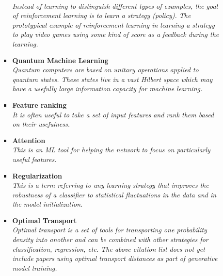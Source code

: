 \documentclass[12pt,letterpaper]{article}
\begin{document}
\begin{itemize}
\begin{itemize}
\begin{itemize}
				\\\textit{Instead of learning to distinguish different types of examples, the goal of reinforcement learning is to learn a strategy (policy).  The prototypical example of reinforcement learning in learning a strategy to play video games using some kind of score as a feedback during the learning.}
				\item \textbf{Quantum Machine Learning}~\cite{Ali:2025gni,Le:2025swl,Pyretzidis:2025stx,Rodriguez-Grasa:2025ggh,Casals:2025cuc,Yin:2025hnt,Le:2025swl,Duffy:2025hsl,Bal:2025ydm,Hammad:2024dsn,Scott:2024txs,Yang:2024bqw,Nelakurti:2024xol,Zhang:2024ebl,Lazar:2024luq,Chen:2024rna,Hoque:2023zjt,Hammad:2023wme,Rehm:2023ovj,Schuhmacher:2023pro,Wozniak:2023xbe,Rousselot:2023pcj,Duckett:2022ccc,Araz:2022zxk,Peixoto:2022zzk,Alvi:2022fkk,Delgado:2022aty,Araz:2022haf,Abel:2022lqr,Gianelle:2022unu,Ngairangbam:2021yma,Kim:2021wrr,Bravo-Prieto:2021ehz,Araz:2021ifk,Belis:2021zqi,Wu:2021xsj,Heredge:2021vww,Blance:2021gcs,Chen:2021ouz,Guan:2020bdl,Wu:2020cye,Chen:2020zkj,Terashi:2020wfi,Blance:2020nhl,Zlokapa:2019lvv,Mott:2017xdb}
				\\\textit{Quantum computers are based on unitary operations applied to quantum states.  These states live in a vast Hilbert space which may have a usefully large information capacity for machine learning.}
				\item \textbf{Feature ranking}~\cite{Das:2022cjl,Grojean:2020ech,Faucett:2020vbu}
				\\\textit{It is often useful to take a set of input features and rank them based on their usefulness.}
				\item \textbf{Attention}~\cite{Fuks:2025qgh,Wu:2025jza,Esmail:2025kii,Kach:2023rqw,Biassoni:2023lih,Qiu:2023ihi,Finke:2023veq,goto2021development}
				\\\textit{This is an ML tool for helping the network to focus on particularly useful features.}
				\item \textbf{Regularization}~\cite{Sforza:2013hua,Araz:2021wqm}
				\\\textit{This is a term referring to any learning strategy that improves the robustness of a classifier to statistical fluctuations in the data and in the model initialization.}
				\item \textbf{Optimal Transport}~\cite{Algren:2025zff,ATLAS:2025rbr,Bright-Thonney:2023sqf,ATLAS:2023mny,Gouskos:2022xvn,Manole:2022bmi,Cai:2021hnn,Pollard:2021fqv,Romao:2020ojy,Cai:2020vzx,Komiske:2019fks}
				\\\textit{Optimal transport is a set of tools for transporting one probability density into another and can be combined with other strategies for classification, regression, etc.  The above citation list does not yet include papers using optimal transport distances as part of generative model training.}

\end{itemize}
\end{itemize}
\end{itemize}
\end{document}
